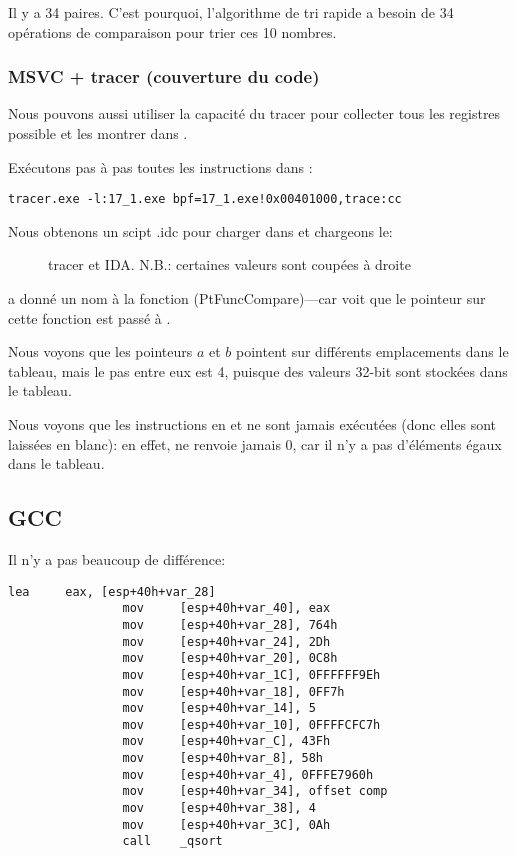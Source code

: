 Il y a 34 paires.
C'est pourquoi, l'algorithme de tri rapide a besoin de 34 opérations de comparaison
pour trier ces 10 nombres.

\clearpage
\subsubsection{MSVC + tracer (couverture du code)}

Nous pouvons aussi utiliser la capacité du tracer pour collecter tous les registres
possible et les montrer dans \IDA.

Exécutons pas à pas toutes les instructions dans \comp:

\begin{lstlisting}
tracer.exe -l:17_1.exe bpf=17_1.exe!0x00401000,trace:cc
\end{lstlisting}

Nous obtenons un scipt .idc pour charger dans \IDA et chargeons le:

\begin{figure}[H]
\centering
{}
\caption{tracer et IDA. N.B.: 
certaines valeurs sont coupées à droite}
\label{fig:qsort_tracer_cc}
\end{figure}

\IDA a donné un nom à la fonction (PtFuncCompare)---car \IDA voit que le pointeur sur
cette fonction est passé à \qsort.

Nous voyons que les pointeurs $a$ et $b$ pointent sur différents emplacements dans
le tableau, mais le pas entre eux est 4, puisque des valeurs 32-bit sont stockées
dans le tableau.

Nous voyons que les instructions en  et  ne sont jamais
exécutées (donc elles sont laissées en blanc): en effet, \comp ne renvoie jamais
0, car il n'y a pas d'éléments égaux dans le tableau.

\subsection{GCC}

Il n'y a pas beaucoup de différence:

\begin{lstlisting}[caption=GCC,style=customasmx86]
                lea     eax, [esp+40h+var_28]
                mov     [esp+40h+var_40], eax
                mov     [esp+40h+var_28], 764h
                mov     [esp+40h+var_24], 2Dh
                mov     [esp+40h+var_20], 0C8h
                mov     [esp+40h+var_1C], 0FFFFFF9Eh
                mov     [esp+40h+var_18], 0FF7h
                mov     [esp+40h+var_14], 5
                mov     [esp+40h+var_10], 0FFFFCFC7h
                mov     [esp+40h+var_C], 43Fh
                mov     [esp+40h+var_8], 58h
                mov     [esp+40h+var_4], 0FFFE7960h
                mov     [esp+40h+var_34], offset comp
                mov     [esp+40h+var_38], 4
                mov     [esp+40h+var_3C], 0Ah
                call    _qsort
\end{lstlisting}

